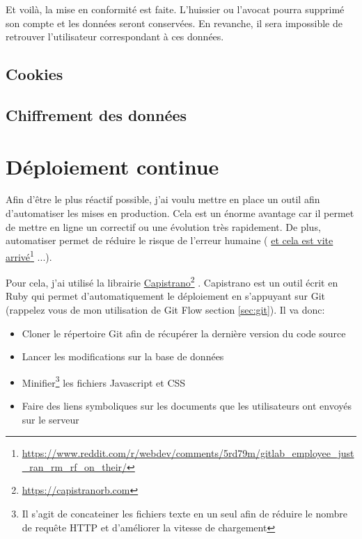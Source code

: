 \documentclass[]{report}
\newcommand\fnurl[2]{%
  \href{#1}{#2}\footnote{\url{#1}}%
}
\begin{document}
        Et voilà, la mise en conformité est faite. L'huissier ou l'avocat pourra supprimé son compte et les données seront conservées. En revanche, il sera impossible de retrouver l'utilisateur correspondant à ces données.

    \subsection{Cookies}


    \subsection{Chiffrement des données}


  \section{Déploiement continue}\label{sec:deployments}

    Afin d'être le plus réactif possible, j'ai voulu mettre en place un outil afin d'automatiser les mises en production. Cela est un énorme avantage car il permet de mettre en ligne un correctif ou une évolution très rapidement. De plus, automatiser permet de réduire le risque de l'erreur humaine (\fnurl{https://www.reddit.com/r/webdev/comments/5rd79m/gitlab_employee_just_ran_rm_rf_on_their/}{et cela est vite arrivé}...).

    Pour cela, j'ai utilisé la librairie \fnurl{https://capistranorb.com}{Capistrano}. Capistrano est un outil écrit en Ruby qui permet d'automatiquement le déploiement en s'appuyant sur Git (rappelez vous de mon utilisation de Git Flow section \ref{sec:git}). Il va donc:

    \begin{itemize}
      \item Cloner le répertoire Git afin de récupérer la dernière version du code source
      \item Lancer les modifications sur la base de données
      \item Minifier\footnote{Il s'agit de concateiner les fichiers texte en un seul afin de réduire le nombre de requête HTTP et d'améliorer la vitesse de chargement} les fichiers Javascript et CSS
      \item Faire des liens symboliques sur les documents que les utilisateurs ont envoyés sur le serveur
    \end{itemize}
\end{document}
